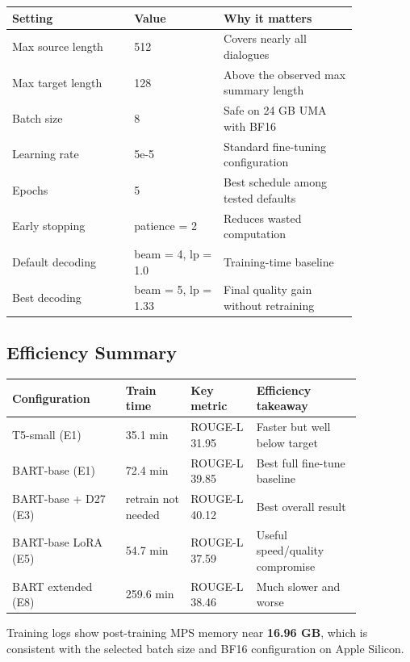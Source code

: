 \documentclass[11pt,a4paper]{article}
\begin{document}
\begin{center}
\begin{tabular}{p{0.30\linewidth}p{0.22\linewidth}p{0.33\linewidth}}
\toprule
\textbf{Setting} & \textbf{Value} & \textbf{Why it matters} \\
\midrule
Max source length & 512 & Covers nearly all dialogues \\
Max target length & 128 & Above the observed max summary length \\
Batch size & 8 & Safe on 24 GB UMA with BF16 \\
Learning rate & 5e-5 & Standard fine-tuning configuration \\
Epochs & 5 & Best schedule among tested defaults \\
Early stopping & patience = 2 & Reduces wasted computation \\
Default decoding & beam = 4, lp = 1.0 & Training-time baseline \\
Best decoding & beam = 5, lp = 1.33 & Final quality gain without retraining \\
\bottomrule
\end{tabular}
\end{center}

\subsection{Efficiency Summary}

\begin{center}
\small
\begin{tabular}{p{0.28\linewidth}p{0.16\linewidth}p{0.16\linewidth}p{0.26\linewidth}}
\toprule
\textbf{Configuration} & \textbf{Train time} & \textbf{Key metric} & \textbf{Efficiency takeaway} \\
\midrule
T5-small (E1) & 35.1 min & ROUGE-L 31.95 & Faster but well below target \\
BART-base (E1) & 72.4 min & ROUGE-L 39.85 & Best full fine-tune baseline \\
BART-base + D27 (E3) & retrain not needed & ROUGE-L 40.12 & Best overall result \\
BART-base LoRA (E5) & 54.7 min & ROUGE-L 37.59 & Useful speed/quality compromise \\
BART extended (E8) & 259.6 min & ROUGE-L 38.46 & Much slower and worse \\
\bottomrule
\end{tabular}
\end{center}

Training logs show post-training MPS memory near \textbf{16.96 GB}, which is consistent with the selected batch size and BF16 configuration on Apple Silicon.
\end{document}
